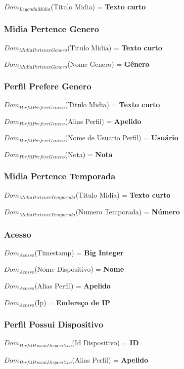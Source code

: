 \documentclass[12pt,a4paper]{article}
\newcommand{\createdomain}[3]{
    $Dom_{#1}$(#2) = {\bf #3}
}
\begin{document}
        \createdomain{Legenda Midia}{Titulo Midia}{Texto curto}


    \subsubsection{Midia Pertence Genero}
        \createdomain{Midia Pertence Genero}{Titulo Midia}{Texto curto}

        \createdomain{Midia Pertence Genero}{Nome Genero}{Gênero}


    \subsubsection{Perfil Prefere Genero}
        \createdomain{Perfil Prefere Genero}{Titulo Midia}{Texto curto}

        \createdomain{Perfil Prefere Genero}{Alias Perfil}{Apelido}

        \createdomain{Perfil Prefere Genero}{Nome de Usuario Perfil}{Usuário}

        \createdomain{Perfil Prefere Genero}{Nota}{Nota}


    \subsubsection{Midia Pertence Temporada}
        \createdomain{Midia Pertence Temporada}{Titulo Midia}{Texto curto}

        \createdomain{Midia Pertence Temporada}{Numero Temporada}{Número}


    \subsubsection{Acesso}
        \createdomain{Acesso}{Timestamp}{Big Integer}

        \createdomain{Acesso}{Nome Dispositivo}{Nome}

        \createdomain{Acesso}{Alias Perfil}{Apelido}

        \createdomain{Acesso}{Ip}{Endereço de IP}


    \subsubsection{Perfil Possui Dispositivo}
        \createdomain{Perfil Possui Dispositivo}{Id Dispositivo}{ID}

        \createdomain{Perfil Possui Dispositivo}{Alias Perfil}{Apelido}
\end{document}
